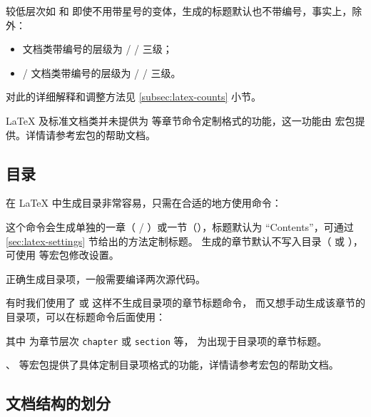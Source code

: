 较低层次如  和  即使不用带星号的变体，生成的标题默认也不带编号，事实上，除  外：
\begin{itemize}
  \item {} 文档类带编号的层级为  /  /  三级；
  \item {}/ 文档类带编号的层级为  /  /  三级。
\end{itemize}
对此的详细解释和调整方法见 \ref{subsec:latex-counts} 小节。

\LaTeX{} 及标准文档类并未提供为  等章节命令定制格式的功能，这一功能由  宏包提供。详情请参考宏包的帮助文档。

\subsection{目录}\label{sec:toc}

在 \LaTeX{} 中生成目录非常容易，只需在合适的地方使用命令：
\begin{command}
\end{command}

这个命令会生成单独的一章（ / ）或一节（），标题默认为 ``Contents''{}，可通过 \ref{sec:latex-settings} 节给出的方法定制标题。
 生成的章节默认不写入目录（ 或 ），可使用  等宏包修改设置。

正确生成目录项，一般需要编译两次源代码。

有时我们使用了  或  这样不生成目录项的章节标题命令，
而又想手动生成该章节的目录项，可以在标题命令后面使用：
\begin{command}
\end{command}

其中  为章节层次 \texttt{chapter} 或 \texttt{section} 等， 为出现于目录项的章节标题。

、 等宏包提供了具体定制目录项格式的功能，详情请参考宏包的帮助文档。

\subsection{文档结构的划分}\label{sec:matters}

